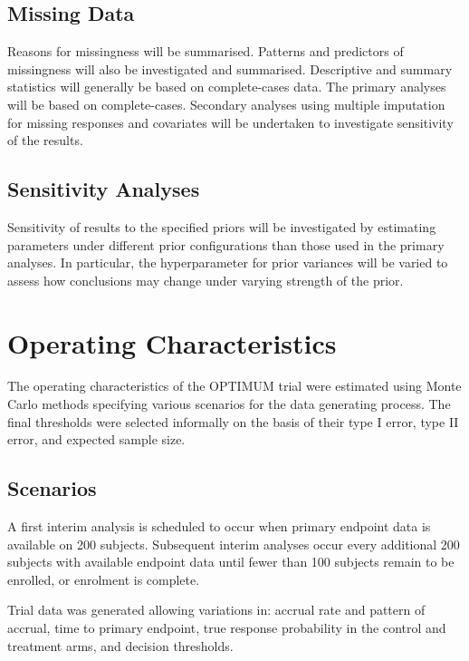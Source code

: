 \documentclass{bmcart}
\begin{document}
\subsection*{Missing Data}

Reasons for missingness will be summarised.
Patterns and predictors of missingness will also be investigated and summarised.
Descriptive and summary statistics will generally be based on complete-cases data.
The primary analyses will be based on complete-cases.
Secondary analyses using multiple imputation for missing responses and covariates will be undertaken to investigate sensitivity of the results.

\subsection*{Sensitivity Analyses}

Sensitivity of results to the specified priors will be investigated by estimating parameters under different prior configurations than those used in the primary analyses.
In particular, the hyperparameter for prior variances will be varied to assess how conclusions may change under varying strength of the prior.

\section*{Operating Characteristics}

The operating characteristics of the OPTIMUM trial were estimated using Monte Carlo methods specifying various scenarios for the data generating process. The final thresholds were selected informally on the basis of their type I error, type II error, and expected sample size.

\subsection*{Scenarios}

A first interim analysis is scheduled to occur when primary endpoint data is available on 200 subjects.
Subsequent interim analyses occur every additional 200 subjects with available endpoint data until fewer than 100 subjects remain to be enrolled, or enrolment is complete.

Trial data was generated allowing variations in: accrual rate and pattern of accrual, time to primary endpoint, true response probability in the control and treatment arms, and decision thresholds.
\end{document}
